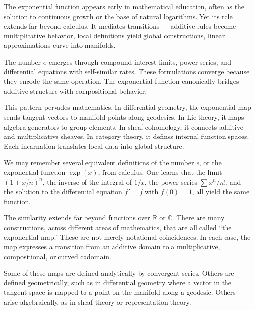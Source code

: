 The exponential function appears early in mathematical education, often as the solution to continuous growth or the base of natural logarithms. Yet its role extends far beyond calculus. It mediates transitions — additive rules become multiplicative behavior, local definitions yield global constructions, linear approximations curve into manifolds.

The number \( e \) emerges through compound interest limits, power series, and differential equations with self-similar rates. These formulations converge because they encode the same operation. The exponential function canonically bridges additive structure with compositional behavior.

This pattern pervades mathematics. In differential geometry, the exponential map sends tangent vectors to manifold points along geodesics. In Lie theory, it maps algebra generators to group elements. In sheaf cohomology, it connects additive and multiplicative sheaves. In category theory, it defines internal function spaces. Each incarnation translates local data into global structure.

We may remember several equivalent definitions of the number \( e \), or the exponential function \( \exp(x) \), from calculus. One learns that the limit $\left(1 + x/n\right)^n$,
the inverse of the integral of \( 1/x \), the power series \( \sum x^n/n! \), and the solution to the differential equation \( f' = f \) with \( f(0) = 1 \), all yield the same function.

The similarity extends far beyond functions over \( \mathbb{R} \) or \( \mathbb{C} \). There are many constructions, across different areas of mathematics, that are all called “the exponential map.” These are not merely notational coincidences. In each case, the map expresses a transition from an additive domain to a multiplicative, compositional, or curved codomain.

Some of these maps are defined analytically by convergent series. Others are defined geometrically, such as in differential geometry where a vector in the tangent space is mapped to a point on the manifold along a geodesic. Others arise algebraically, as in sheaf theory or representation theory. 



